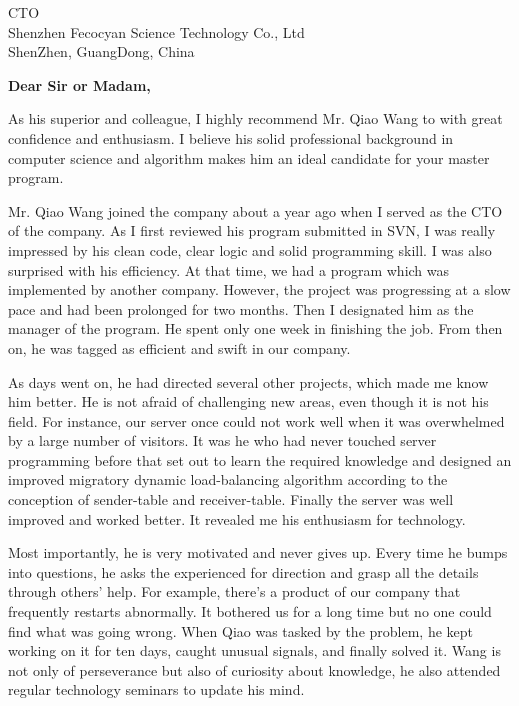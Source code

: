 \documentclass{letter}
\begin{document}

\begin{letter}{CTO \\ Shenzhen Fecocyan Science Technology Co., Ltd \\ ShenZhen, GuangDong, China} %


\opening{\textbf{Dear Sir or Madam,}}
 
As his superior and colleague, I highly recommend Mr. Qiao Wang to with great confidence and enthusiasm. I believe his solid professional background in computer science and algorithm makes him an ideal candidate for your master program.

Mr. Qiao Wang joined the company about a year ago when I served as the CTO of the company. As I first reviewed his program submitted in SVN, I was really impressed by his clean code, clear logic and solid programming skill. I was also surprised with his efficiency. At that time, we had a program which was implemented by another company. However, the project was progressing at a slow pace and had been prolonged for two months. Then I designated him as the manager of the program. He spent only one week in finishing the job. From then on, he was tagged as efficient and swift in our company.

As days went on, he had directed several other projects, which made me know him better. 	He is not afraid of challenging new areas, even though it is not his field. For instance, our server once could not work well when it was overwhelmed by a large number of visitors. It was he who had never touched server programming before that set out to learn the required knowledge and designed an improved migratory dynamic load-balancing algorithm according to the conception of sender-table and receiver-table. Finally the server was well improved and worked better. It revealed me his enthusiasm for technology.

Most importantly, he is very motivated and never gives up. Every time he bumps into questions, he asks the experienced for direction and grasp all the details through others’ help. For example, there’s a product of our company that frequently restarts abnormally. It bothered us for a long time but no one could find what was going wrong. When Qiao was tasked by the problem, he kept working on it for ten days, caught unusual signals, and finally solved it. Wang is not only of perseverance but also of curiosity about knowledge, he also attended regular technology seminars to update his mind.


\end{letter}
\end{document}
